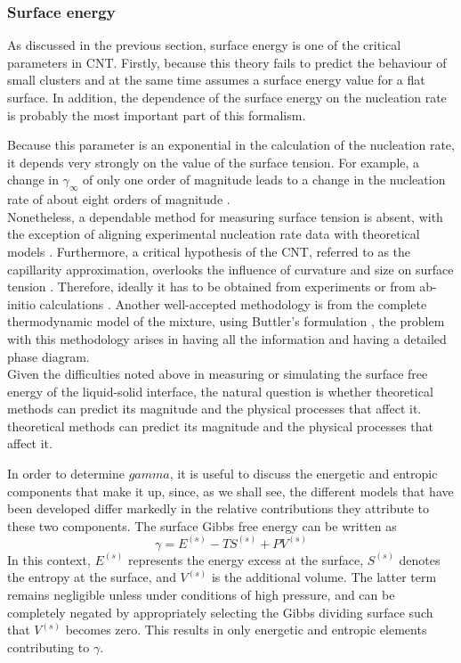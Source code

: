 \subsubsection{Surface energy}

As discussed in the previous section, surface energy is one of the critical parameters in CNT. Firstly, because this theory fails to predict the behaviour of small clusters 
and at the same time assumes a surface energy value for a flat surface. In addition, the dependence of the surface energy on the nucleation rate is probably the most important part of this formalism. 

Because this parameter is an exponential in the calculation of the nucleation rate, it depends very strongly on the value of the surface tension. For example, a change in $\gamma_{\infty}$ of only one order of magnitude
leads to a change in the nucleation rate of about eight orders of magnitude \cite{Ulbricht1998}.
\\
Nonetheless, a dependable method for measuring surface tension is absent, with the exception of aligning experimental nucleation rate data with theoretical models \cite{Fokin2006HomogeneousCN}. 
Furthermore, a critical hypothesis of the CNT, referred to as the capillarity approximation, overlooks the influence of curvature and size on surface tension \cite{SANGWAL19963}.
Therefore, ideally it has to be obtained from experiments or from ab-initio calculations \cite{Sun2020, Lee2018, Vitos1998, Holec2012, Binnie2010}. 
Another well-accepted methodology is from the complete thermodynamic model of the mixture, using Buttler's formulation \cite{Silva, Picha2004, Krasin2015}, 
the problem with this methodology arises in having all the information and having a detailed phase diagram.
\\
Given the difficulties noted above in measuring or simulating the surface free energy of the liquid-solid interface, the natural question is whether theoretical methods 
can predict its magnitude and the physical processes that affect it. 
theoretical methods can predict its magnitude and the physical processes that affect it. 

In order to determine $gamma$, it is useful to discuss the energetic and entropic components that make it up, 
since, as we shall see, the different models that have been developed differ markedly in the relative contributions they attribute to these two components. 
The surface Gibbs free energy can be written as
\begin{equation} \label{eq:Gibbs_free_energy}
\gamma = E^{(s)} - T S^{(s)} + P V^{(s)}
\end{equation}
In this context, $E^{(s)}$ represents the energy excess at the surface, $S^{(s)}$ denotes the entropy at the surface, and $V^{(s)}$ is the additional volume. 
The latter term remains negligible unless under conditions of high pressure, and can be completely negated by appropriately selecting the Gibbs dividing surface such 
that $V^{(s)}$ becomes zero. This results in only energetic and entropic elements contributing to $\gamma$.

